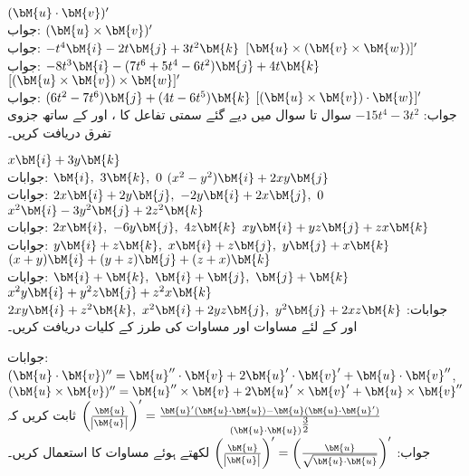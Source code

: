 \quad
$(\bM{u}\cdot \bM{v})'$\\
جواب:
\quad
$(\bM{u}\times \bM{v})'$\\
جواب:
$-t^4\bM{i}-2t\bM{j}+3t^2\bM{k}$
\quad
$[\bM{u}\times (\bM{v}\times \bM{w})]'$\\
جواب:
$-8t^3\bM{i}-(7t^6+5t^4-6t^2)\bM{j}+4t\bM{k}$
\quad
$[(\bM{u}\times \bM{v})\times \bM{w}]'$\\
جواب:
$(6t^2-7t^6)\bM{j}+(4t-6t^5)\bM{k}$
\quad
$[(\bM{u}\times \bM{v})\cdot\bM{w}]'$\\
جواب:
$-15t^4-3t^2$
سوال  تا سوال  میں دیے گئے سمتی تفاعل  کا  ،   اور  کے ساتھ جزوی تفرق دریافت کریں۔

\quad
$x\bM{i}+3y\bM{k}$\\
جوابات:
$\bM{i},\,\, 3\bM{k},\,\, 0$
\quad
$(x^2-y^2)\bM{i}+2xy\bM{j}$\\
جوابات:
$2x\bM{i}+2y\bM{j},\,\, -2y\bM{i}+2x\bM{j},\,\, 0$
\quad
$x^2\bM{i}-3y^2\bM{j}+2z^2\bM{k}$\\
جوابات:
$2x\bM{i},\,\, -6y\bM{j},\,\,4z\bM{k}$
\quad
$xy\bM{i}+yz\bM{j}+zx\bM{k}$\\
جوابات:
$y\bM{i}+z\bM{k},\,\, x\bM{i}+z\bM{j},\,\,y\bM{j}+x\bM{k}$
\quad
$(x+y)\bM{i}+(y+z)\bM{j}+(z+x)\bM{k}$\\
جوابات:
$\bM{i}+\bM{k},\,\, \bM{i}+\bM{j},\,\,\bM{j}+\bM{k}$
\quad
$x^2y\bM{i}+y^2z\bM{j}+z^2x\bM{k}$\\
جوابات:
$2xy\bM{i}+z^2\bM{k},\,\, x^2\bM{i}+2yz\bM{j},\,\,y^2\bM{j}+2xz\bM{k}$
 اور  کے لئے مساوات  اور مساوات  کی طرز کے کلیات دریافت کریں۔

جوابات:
$(\bM{u}\cdot \bM{v})''=\bM{u}''\cdot \bM{v}+2\bM{u}'\cdot \bM{v}'+\bM{u}\cdot \bM{v}'' $, \\  $(\bM{u}\times \bM{v})''=\bM{u}''\times \bM{v}+2\bM{u}'\times \bM{v}'+\bM{u}\times \bM{v}''$
ثابت کریں کہ
$\left(\tfrac{\bM{u}}{\abs{\bM{u}}}\right)'=\tfrac{\bM{u}'(\bM{u}\cdot \bM{u})-\bM{u}(\bM{u}\cdot \bM{u}')}{(\bM{u}\cdot \bM{u})^{\tfrac{3}{2}}}$\\
جواب:
$\left(\tfrac{\bM{u}}{\abs{\bM{u}}}\right)'=\left(\tfrac{\bM{u}}{\sqrt{\bM{u}\cdot \bM{u}}}\right)'$
 لکھتے ہوئے  مساوات  کا استعمال کریں۔

